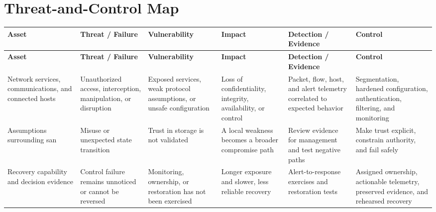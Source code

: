 \documentclass[11pt]{article}
\begin{document}
\section*{Threat-and-Control Map}
\begingroup\scriptsize\setlength{\tabcolsep}{2pt}
\begin{longtable}{>{\RaggedRight\arraybackslash}p{}>{\RaggedRight\arraybackslash}p{}>{\RaggedRight\arraybackslash}p{}>{\RaggedRight\arraybackslash}p{}>{\RaggedRight\arraybackslash}p{}>{\RaggedRight\arraybackslash}p{}}
\toprule\rowcolor{Navy}\color{white}\textbf{Asset} & \color{white}\textbf{Threat / Failure} & \color{white}\textbf{Vulnerability} & \color{white}\textbf{Impact} & \color{white}\textbf{Detection / Evidence} & \color{white}\textbf{Control}\\\midrule
\endfirsthead
\toprule\rowcolor{Navy}\color{white}\textbf{Asset} & \color{white}\textbf{Threat / Failure} & \color{white}\textbf{Vulnerability} & \color{white}\textbf{Impact} & \color{white}\textbf{Detection / Evidence} & \color{white}\textbf{Control}\\\midrule
\endhead
Network services, communications, and connected hosts & Unauthorized access, interception, manipulation, or disruption & Exposed services, weak protocol assumptions, or unsafe configuration & Loss of confidentiality, integrity, availability, or control & Packet, flow, host, and alert telemetry correlated to expected behavior & Segmentation, hardened configuration, authentication, filtering, and monitoring\\\midrule
Assumptions surrounding san & Misuse or unexpected state transition & Trust in storage is not validated & A local weakness becomes a broader compromise path & Review evidence for management and test negative paths & Make trust explicit, constrain authority, and fail safely\\\midrule
Recovery capability and decision evidence & Control failure remains unnoticed or cannot be reversed & Monitoring, ownership, or restoration has not been exercised & Longer exposure and slower, less reliable recovery & Alert-to-response exercises and restoration tests & Assigned ownership, actionable telemetry, preserved evidence, and rehearsed recovery\\\midrule
\bottomrule
\end{longtable}
\endgroup
\end{document}
